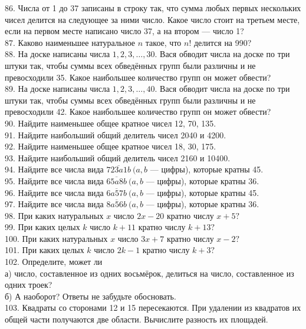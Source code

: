 86. Числа от 1 до 37 записаны в строку так, что сумма любых первых нескольких чисел делится на следующее за ними число. Какое число стоит на третьем месте, если на первом месте написано число 37, а на втором --- число 1?\\
87. Каково наименьшее натуральное $n$ такое, что $n!$ делится на 990?\\
88. На доске написаны числа $1, 2, 3,\ldots, 30.$ Вася обводит числа на доске по три штуки так, чтобы суммы всех обведённых групп были различны и не превосходили 35. Какое наибольшее количество групп он может обвести?\\
89. На доске написаны числа $1, 2, 3,\ldots, 40.$ Вася обводит числа на доске по три штуки так, чтобы суммы всех обведённых групп были различны и не превосходили 42. Какое наибольшее количество групп он может обвести?\\
90. Найдите наименьшее общее кратное чисел 12, 70, 135.\\
91. Найдите наибольший общий делитель чисел 2040 и 4200.\\
92. Найдите наименьшее общее кратное чисел 18, 30, 175.\\
93. Найдите наибольший общий делитель чисел 2160 и 10400.\\
94. Найдите все числа вида $\overline{723a1b}\ (a,b$ --- цифры), которые кратны 45.\\
95. Найдите все числа вида $\overline{65a8b}\ (a,b$ --- цифры), которые кратны 36.\\
96. Найдите все числа вида $\overline{6a57b}\ (a,b$ --- цифры), которые кратны 45.\\
97. Найдите все числа вида $\overline{8a56b}\ (a,b$ --- цифры), которые кратны 36.\\
98. При каких натуральных $x$ число $2x-20$ кратно числу $x+5?$\\
99. При каких целых $k$ число $k+11$ кратно числу $k+13?$\\
100. При каких натуральных $x$ число $3x+7$ кратно числу $x-2?$\\
101. При каких целых $k$ число $2k-1$ кратно числу $k+3?$\\
102. Определите, может ли\\
а) число, составленное из одних восьмёрок, делиться на число, составленное из одних троек?\\
б) А наоборот? Ответы не забудьте обосновать.\\
103. Квадраты со сторонами 12 и 15 пересекаются. При удалении из квадратов их общей части получаются две области. Вычислите разность их площадей.\\
